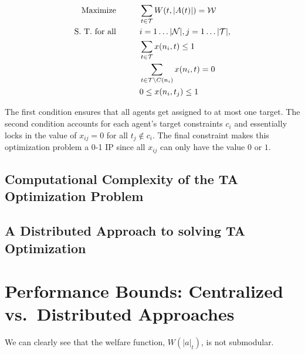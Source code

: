 \documentclass[11pt, onecolumn, compsoc, letterpaper]{article}
\newcommand{\Pl}{\mathcal{N}} %
\newcommand{\Ta}{\mathcal{T}} %
\newcommand{\We}{\mathcal{W}} %
\begin{document}
\begin{align}\label{eq:ilp}
	\text{Maximize}\hspace{1cm} & \sum\limits_{t \in \Ta} W(t, |A(t)|) = \We\\
	\text{S. T. for all}\hspace{1cm} & i = 1\ldots|\Pl|, j = 1\ldots|\Ta|,\notag\\
	& \sum\limits_{t \in \Ta} x(n_i, t) \leq 1\notag\\
	& \sum\limits_{t \in \Ta \backslash C(n_i)} x(n_i, t) = 0\notag\\
	& 0 \leq x(n_i, t_j) \leq 1\notag
\end{align}

The first condition ensures that all agents get assigned to at most one target. The second condition accounts for each agent's target constraints $c_i$ and essentially locks in the value of $x_{ij} = 0$ for all $t_j \not\in c_i$. The final constraint makes this optimization problem a 0-1 IP since all $x_{ij}$ can only have the value $0$ or $1$.




\subsection{Computational Complexity of the TA Optimization Problem}



\subsection{A Distributed Approach to solving TA Optimization}



\section{Performance Bounds: Centralized vs.~Distributed Approaches}
We can clearly see that the welfare function, $W(|a|_t)$, is not submodular.
\end{document}
